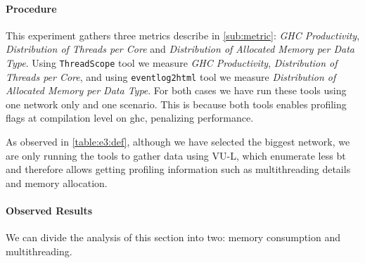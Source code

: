 \paragraph{Procedure} This experiment gathers three metrics describe in \autoref{sub:metric}: \emph{GHC Productivity}, \emph{Distribution of Threads per Core} and \emph{Distribution of Allocated Memory per Data Type}.
Using \texttt{ThreadScope} \cite{threadscope} tool we measure \emph{GHC Productivity}, \emph{Distribution of Threads per Core}, and using \texttt{eventlog2html} \cite{eventlog2html} tool we measure \emph{Distribution of Allocated Memory per Data Type}.
For both cases we have run these tools using one network only and one scenario. This is because both tools enables profiling flags at compilation level on \acrshort{ghc}, penalizing performance.

\begin{table}[H]
\centering
{}
\caption[{[EE] E3 Procedure}]{This table shows the experiments scenario run for each of the tools. Notice the increase of \texttt{-A} and \texttt{-H} to support more memory allocation due to the profiling analysis}
\label{table:e3:def}
\end{table}

As observed in \autoref{table:e3:def}, although we have selected the biggest network, we are only running the tools to gather data using VU-L, which enumerate less \acrshort{bt} and therefore allows getting profiling information such as multithreading details and memory allocation.

\paragraph{Observed Results}\label{sub:sec:res:e3}
We can divide the analysis of this section into two: memory consumption and multithreading.

